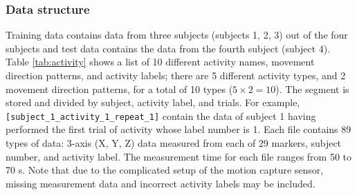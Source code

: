 \documentclass[graybox]{svmult}
\begin{document}
\subsubsection{Data structure}
Training data contains data from three subjects (subjects 1, 2, 3) out of the four subjects and test data contains the data from the fourth subject (subject 4).
Table \ref{tab:activity} shows a list of 10 different activity names, movement direction patterns, and activity labels; there are 5 different activity types, and 2 movement direction patterns, for a total of 10 types ($5 \times 2 = 10$).
The segment is stored and divided by subject, activity label, and trials. For example, {\tt [subject\verb|_|1\verb|_|activity\verb|_|1\verb|_|repeat\verb|_|1]} contain the data of subject 1 having performed the first trial of activity whose label number is 1.
Each file contains 89 types of data: 3-axis (X, Y, Z) data measured from each of 29 markers, subject number, and activity label. The measurement time for each file ranges from 50 to 70 s.
Note that due to the complicated setup of the motion capture sensor, missing measurement data and incorrect activity labels may be included.
\end{document}
